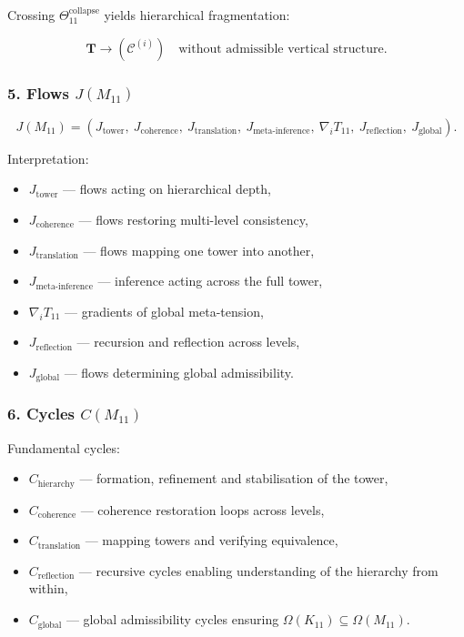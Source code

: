 Crossing $\Theta_{11}^{\mathrm{collapse}}$ yields hierarchical fragmentation:

\[
\mathbf{T} \to (\mathcal{C}^{(i)}) \quad \text{without admissible vertical structure}.
\]

\subsubsection*{5. Flows $J(M_{11})$}

\[
J(M_{11}) =
(
J_{\mathrm{tower}},\
J_{\mathrm{coherence}},\
J_{\mathrm{translation}},\
J_{\mathrm{meta\mbox{-}inference}},\
\nabla_i T_{11},\
J_{\mathrm{reflection}},\
J_{\mathrm{global}}
).
\]

Interpretation:

\begin{itemize}
    \item $J_{\mathrm{tower}}$ — flows acting on hierarchical depth,
    \item $J_{\mathrm{coherence}}$ — flows restoring multi-level consistency,
    \item $J_{\mathrm{translation}}$ — flows mapping one tower into another,
    \item $J_{\mathrm{meta\mbox{-}inference}}$ — inference acting across the full tower,
    \item $\nabla_i T_{11}$ — gradients of global meta-tension,
    \item $J_{\mathrm{reflection}}$ — recursion and reflection across levels,
    \item $J_{\mathrm{global}}$ — flows determining global admissibility.
\end{itemize}

\subsubsection*{6. Cycles $C(M_{11})$}

Fundamental cycles:

\begin{itemize}
    \item $C_{\mathrm{hierarchy}}$ — formation, refinement and stabilisation of the tower,
    \item $C_{\mathrm{coherence}}$ — coherence restoration loops across levels,
    \item $C_{\mathrm{translation}}$ — mapping towers and verifying equivalence,
    \item $C_{\mathrm{reflection}}$ — recursive cycles enabling 
          understanding of the hierarchy from within,
    \item $C_{\mathrm{global}}$ — global admissibility cycles ensuring
          $\Omega(K_{11})\subseteq\Omega(M_{11})$.
\end{itemize}

